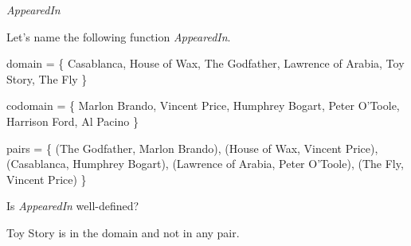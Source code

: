 \documentclass{ximera}
\begin{document}
\begin{example} \textit{AppearedIn}

Let's name the following function \textit{AppearedIn}.

domain = \{ Casablanca, House of Wax,  The Godfather, Lawrence of Arabia, Toy Story, The Fly \}

codomain = \{ Marlon Brando, Vincent Price, Humphrey Bogart, Peter O'Toole, Harrison Ford, Al Pacino \}

pairs = \{ (The Godfather, Marlon Brando), (House of Wax, Vincent Price), (Casablanca, Humphrey Bogart), (Lawrence of Arabia, Peter O'Toole), (The Fly, Vincent Price) \} 





\begin{question}

Is \textit{AppearedIn} well-defined?

\begin{multipleChoice}
\end{multipleChoice}
\begin{feedback}
Toy Story is in the domain and not in any pair.
\end{feedback}

\end{question}



\end{example}
\end{document}
